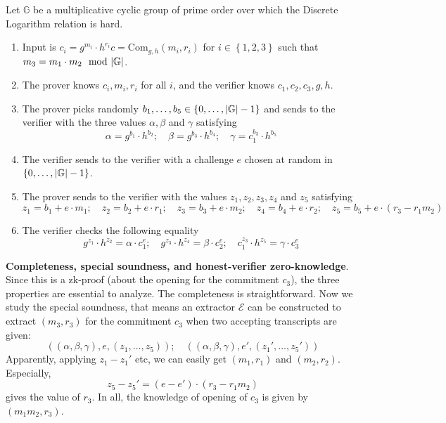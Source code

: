 \documentclass{article}
\begin{document}
\begin{boxx1} \label{def:zk-product-pedersen}
Let $\mathbb{G}$ be a multiplicative cyclic group of prime order over which the Discrete Logarithm relation is hard. 
\begin{enumerate}
\item\label{item:59} Input is $c_i = g^{m_i} \cdot h^{r_i} c = \text{Com}_{g, h}(m_i, r_i)$ for $i \in \left\{ 1, 2, 3 \right\}$ such that $m_3 = m_1 \cdot m_2 \mod \abs{\mathbb{G}}$. 
\item\label{item:60} The prover knows $c_i, m_i, r_i$ for all $i$, and the verifier knows $c_1, c_2, c_3, g, h$. 
\item\label{item:61} The prover picks randomly $b_1, \dots, b_5 \in \left\{ 0, \dots, \abs{\mathbb{G}} - 1 \right\}$ and sends to the verifier with the three values $\alpha, \beta$ and $\gamma$ satisfying 
\begin{equation*}
\alpha = g^{b_1} \cdot h^{b_2};  \quad \beta = g^{b_3} \cdot h^{b_4};  \quad \gamma = c_1^{b_3} \cdot h^{b_5}
\end{equation*}
\item\label{item:62} The verifier sends to the verifier with a challenge $e$ chosen at random in $\left\{ 0, \dots, \abs{\mathbb{G}}-1 \right\}$. 
\item\label{item:63} The prover sends to the verifier with the values $z_1, z_2, z_3, z_4$ and $z_5$ satisfying 
\begin{equation*}
z_1 = b_1 + e \cdot m_1; \quad z_2 = b_2 + e \cdot r_1; \quad z_3 = b_3 + e \cdot m_2; \quad z_4 = b_4 + e \cdot r_2 ; \quad z_5 = b_5 + e \cdot (r_3 - r_1 m_2)
\end{equation*}
\item\label{item:64} The verifier checks the following equality
\begin{equation*}
g^{z_1} \cdot h^{z_2} = \alpha \cdot c_1^e; \quad g^{z_3} \cdot h^{z_4} = \beta \cdot c_2^e; \quad c_1^{z_3} \cdot h^{z_5} = \gamma \cdot c_3^e
\end{equation*}
\end{enumerate}
\end{boxx1}

\textbf{Completeness, special soundness, and honest-verifier zero-knowledge}. Since this is a zk-proof (about the opening for the commitment $c_3$), the three properties are essential to analyze. The completeness is straightforward. Now we study the special soundness, that means an extractor $\mathcal{E}$ can be constructed to extract $(m_3, r_3)$ for the commitment $c_3$ when two accepting transcripts are given: 
\begin{equation*}
\left( \left( \alpha, \beta, \gamma \right), e, (z_1, \dots, z_5) \right) ; \quad \left( \left( \alpha, \beta, \gamma \right), e', (z_1', \dots, z_5') \right)
\end{equation*}
Apparently, applying $z_1 - z_1'$ etc, we can easily get $(m_1, r_1)$ and $(m_2, r_2)$. Especially, 
\begin{equation*}
z_5 - z_5' = (e - e') \cdot (r_3 - r_1m_2)
\end{equation*}
gives the value of $r_3$. In all, the knowledge of opening of $c_3$ is given by $(m_1m_2, r_3)$.
\end{document}
